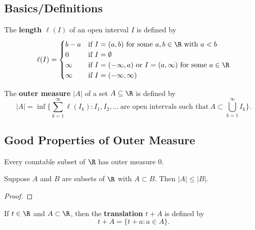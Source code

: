
\subsection{Basics/Definitions}

\begin{definition}
   The \textbf{length \( \ell(I) \)} of an open interval \( I  \) is defined by 
   \[  \ell(I) = 
   \begin{cases}
       b - a &\text{if} \ I = (a,b) \ \text{for some} \ a,b \in \R \ \text{with} \ a < b \\
       0 &\text{if} \ I = \emptyset \\
       \infty &\text{if} \ I = (-\infty ,a) \ \text{or} \ I = (a,\infty ) \ \text{for some} \ a \in \R \\
       \infty  &\text{if} \ I = (-\infty , \infty )
   \end{cases} \]
\end{definition}

\begin{definition}
    The \textbf{outer measure} \( | A  |  \) of a set \( A \subseteq  \R    \) is defined by
    \[  | A  |  = \inf \Big\{ \sum_{ k=1  }^{ \infty  } \ell({I}_{k}) : {I}_{1}, {I}_{2}, \dots \ \text{are open intervals such that} \ A \subset \bigcup_{ k = 1  }^{ \infty  }  {I}_{k}   \Big\}.  \]
\end{definition}


\subsection{Good Properties of Outer Measure}

\begin{prop}
   Every countable subset of \( \R  \) has outer measure \( 0  \). 
\end{prop}

\begin{prop}
   Suppose \( A  \) and \( B  \) are subsets of \( \R  \) with \( A \subset B  \). Then \( | A  |  \leq | B  |  \). 
\end{prop}
\begin{proof}

\end{proof}

\begin{definition}[Translation; \( t + A  \)]
    If \( t \in \R   \) and \( A \subset \R  \), then the \textbf{translation} \( t +  A  \) is defined by 
    \[  t + A = \{  t + a : a \in A  \}. \]
\end{definition}

